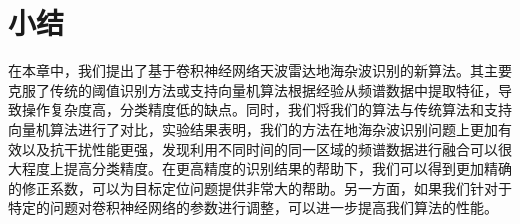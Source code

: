 \section{小结}
在本章中，我们提出了基于卷积神经网络天波雷达地海杂波识别的新算法。其主要克服了传统的阈值识别方法或支持向量机算法根据经验从频谱数据中提取特征，导致操作复杂度高，分类精度低的缺点。同时，我们将我们的算法与传统算法和支持向量机算法进行了对比，实验结果表明，我们的方法在地海杂波识别问题上更加有效以及抗干扰性能更强，发现利用不同时间的同一区域的频谱数据进行融合可以很大程度上提高分类精度。在更高精度的识别结果的帮助下，我们可以得到更加精确的修正系数，可以为目标定位问题提供非常大的帮助。另一方面，如果我们针对于特定的问题对卷积神经网络的参数进行调整，可以进一步提高我们算法的性能。



